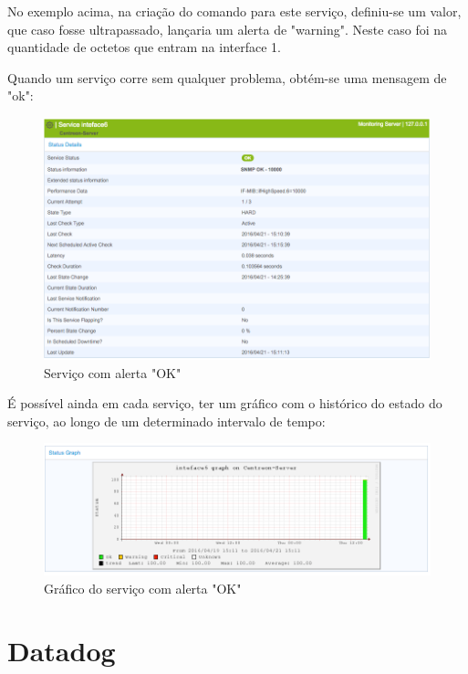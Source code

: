 \documentclass[pdftex,12pt,a4paper]{report}
\begin{document}
No exemplo acima, na criação do comando para este serviço, definiu-se um valor, que caso fosse ultrapassado, lançaria um alerta de "warning". Neste caso foi na quantidade de octetos que entram na interface 1.

\newpage
Quando um serviço corre sem qualquer problema, obtém-se uma mensagem de "ok":

\begin{figure}[!htb]
\center
 \includegraphics[width=150mm,scale=1]{imagens/OKService.png}
 \caption{Serviço com alerta "OK"}
 \label{fig:ok}
\end{figure}

É possível ainda em cada serviço, ter um gráfico com o histórico do estado do serviço, ao longo de um determinado intervalo de tempo:

\begin{figure}[!htb]
\center
 \includegraphics[width=150mm,scale=1]{imagens/OKGraph.png}
 \caption{Gráfico do serviço com alerta "OK"}
 \label{fig:grafico}
\end{figure}

\newpage
\section{Datadog}
\end{document}
